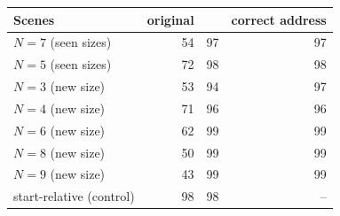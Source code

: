 \begin{tabular}{lrrr}
\toprule
Scenes & original & \rthree{} & correct address \\
\midrule
$N=7$ (seen sizes) & 54 & 97 & 97 \\
$N=5$ (seen sizes) & 72 & 98 & 98 \\
$N=3$ (new size) & 53 & 94 & 97 \\
$N=4$ (new size) & 71 & 96 & 96 \\
$N=6$ (new size) & 62 & 99 & 99 \\
$N=8$ (new size) & 50 & 99 & 99 \\
$N=9$ (new size) & 43 & 99 & 99 \\
start-relative (control) & 98 & 98 & -- \\
\bottomrule
\end{tabular}
